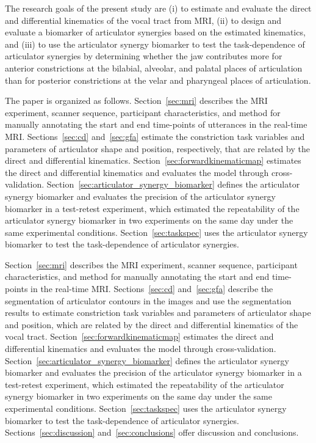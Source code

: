 \documentclass[reprint]{JASAnew}\usepackage[]{graphicx}\usepackage[]{color}
\begin{document}
The research goals of the present study are 
%
(i) to estimate and evaluate the direct and differential kinematics of the vocal tract from MRI, 
%
(ii) to design and evaluate a biomarker of articulator synergies based on the estimated kinematics, and
%
(iii) to use the articulator synergy biomarker to test the task-dependence of articulator synergies by determining whether the jaw contributes more for anterior constrictions at the bilabial, alveolar, and palatal places of articulation than for posterior constrictions at the velar and pharyngeal places of articulation. 


The paper is organized as follows.
%
Section~\ref{sec:mri} describes the MRI experiment, scanner sequence, participant characteristics, and method for manually annotating the start and end time-points of utterances in the real-time MRI.
%
Sections~\ref{sec:cd} and~\ref{sec:gfa} estimate the constriction task variables and parameters of articulator shape and position, respectively, that are related by the direct and differential kinematics. 
% 
Section~\ref{sec:forwardkinematicmap} estimates the direct and differential kinematics and evaluates the model through cross-validation. 
%
Section~\ref{sec:articulator_synergy_biomarker} defines the articulator synergy biomarker and evaluates the precision of the articulator synergy biomarker in a test-retest experiment, which estimated the repeatability of the articulator synergy biomarker in two experiments on the same day under the same experimental conditions. 
% 
Section~\ref{sec:taskspec} uses the articulator synergy biomarker to test the task-dependence of articulator synergies. 

Section~\ref{sec:mri} describes the MRI experiment, scanner sequence, participant characteristics, and method for manually annotating the start and end time-points in the real-time MRI. 
Sections~\ref{sec:cd} and~\ref{sec:gfa} describe the segmentation of articulator contours in the images and use the segmentation results to estimate constriction task variables and parameters of articulator shape and position, which are related by the direct and differential kinematics of the vocal tract. 
Section~\ref{sec:forwardkinematicmap} estimates the direct and differential kinematics and evaluates the model through cross-validation. 
Section~\ref{sec:articulator_synergy_biomarker} defines the articulator synergy biomarker and evaluates the precision of the articulator synergy biomarker in a test-retest experiment, which estimated the repeatability of the articulator synergy biomarker in two experiments on the same day under the same experimental conditions. 
Section~\ref{sec:taskspec} uses the articulator synergy biomarker to test the task-dependence of articulator synergies. 
Sections~\ref{sec:discussion} and~\ref{sec:conclusions} offer discussion and conclusions.
\end{document}

